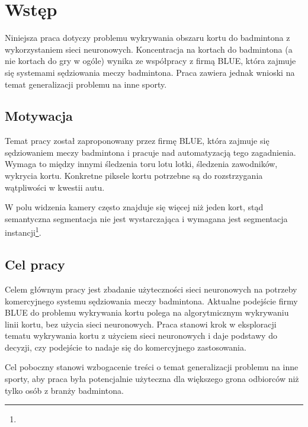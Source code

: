 \chapter{Wstęp}

Niniejsza praca dotyczy problemu wykrywania obszaru kortu do badmintona z wykorzystaniem sieci neuronowych.
Koncentracja na kortach do badmintona (a nie kortach do gry w ogóle) wynika ze współpracy z firmą BLUE, która zajmuje się systemami sędziowania meczy badmintona. Praca zawiera jednak wnioski na temat generalizacji problemu na inne sporty.

\section{Motywacja}

Temat pracy został zaproponowany przez firmę BLUE, która zajmuje się sędziowaniem meczy badmintona i pracuje nad automatyzacją tego zagadnienia. Wymaga to między innymi śledzenia toru lotu lotki, śledzenia zawodników, wykrycia kortu. Konkretne piksele kortu potrzebne są do rozstrzygania wątpliwości w kwestii autu.

W polu widzenia kamery często znajduje się więcej niż jeden kort, stąd semantyczna segmentacja nie jest wystarczająca i wymagana jest segmentacja instancji\footnote{}.

\section{Cel pracy}

Celem głównym pracy jest zbadanie użyteczności sieci neuronowych na potrzeby komercyjnego systemu sędziowania meczy badmintona. Aktualne podejście firmy BLUE do problemu wykrywania kortu polega na algorytmicznym wykrywaniu linii kortu, bez użycia sieci neuronowych. Praca stanowi krok w eksploracji tematu wykrywania kortu z użyciem sieci neuronowych i daje podstawy do decyzji, czy podejście to nadaje się do komercyjnego zastosowania.

Cel poboczny stanowi wzbogacenie treści o temat generalizacji problemu na inne sporty, aby praca była potencjalnie użyteczna dla większego grona odbiorców niż tylko osób z branży badmintona.
\\


